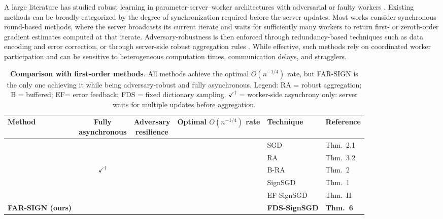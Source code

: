 \documentclass{article}
\newcommand{\cmark}{\ding{51}}
\newcommand{\xmark}{\ding{55}}
\newcommand{\pmark}
{\checkmark^{\dagger}}
\newcommand{\farsign}{FAR-SIGN\xspace}
\begin{document}
A large literature has studied robust learning in parameter-server--worker architectures with adversarial or faulty workers \citep{alistarh2018byzantine, chen2018draco,yin2018byzantine,data2020data,data2019data,data2021byzantine,pillutla2022robust,yang2023buffered,xie2020zeno++,fang2022aflguard,damaskinos2018asynchronous,ghosh2019robust,karimireddy2022byzantine,blanchard2017machine,egger2025byzantine}. 
Existing methods can be broadly categorized by the degree of synchronization required before the server updates. Most works consider synchronous round-based methods, where the server broadcasts its current iterate and waits for sufficiently many workers to return first- or zeroth-order gradient estimates computed at that iterate. Adversary-robustness is then enforced through redundancy-based techniques such as data encoding and error correction, or through server-side robust aggregation rules \citep{alistarh2018byzantine, blanchard2017machine,chen2018draco,data2020data,data2019data,data2021byzantine,yin2018byzantine,pillutla2022robust,karimireddy2022byzantine,egger2025byzantine}. 
While effective, such methods rely on coordinated worker participation and can be sensitive to heterogeneous computation times, communication delays, and stragglers. 

\begin{table}[t]
\centering
\caption{\textbf{Comparison with first-order methods}. 
All methods achieve the optimal $O(n^{-1/4})$ rate, but
\farsign{} is the only one achieving it while being adversary-robust and fully asynchronous. 
Legend: RA = robust aggregation; B = buffered; 
EF= error feedback; FDS = fixed dictionary sampling.  
$\pmark$ = worker-side asynchrony only: server waits for multiple updates before aggregation.}
\label{tab:first_order_compare}
\vspace*{\baselineskip} 
\small
\setlength{\tabcolsep}{5pt}
\begin{tabular}{lcccll}
\toprule
Method 
& \makecell{Fully\\asynchronous} 
& \makecell{Adversary\\resilience} 
& \makecell{Optimal\\$O(n^{-1/4})$ rate} 
& Technique 
& Reference \\
\midrule
\citep{ghadimi}      & \xmark      & \xmark & \cmark & SGD         & Thm.~2.1 \\
\citep{alistarh2018byzantine}        & \xmark      & \cmark & \cmark & RA          & Thm.~3.2 \\
\citep{yang2023buffered}      & $\pmark$ & \cmark & \cmark & B-RA         & Thm.~2 \\
\citep{bernsteinsignsgd}     & \xmark      & \cmark & \cmark & SignSGD     & Thm.~1 \\
\citep{karimireddy2019error}        & \xmark      & \xmark & \cmark & EF-SignSGD     & Thm.~II \\
\textbf{\farsign{} (ours)}   & \cmark      & \cmark & \cmark & \textbf{FDS-SignSGD} & \textbf{Thm.~6} \\
\bottomrule
\end{tabular}
\end{table}
\end{document}
